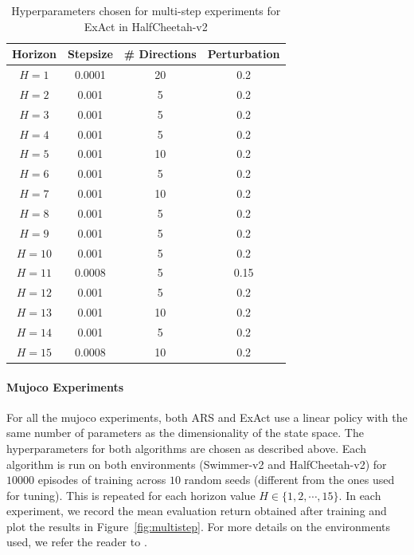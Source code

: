 \begin{table}[ht]
    \centering
    \begin{tabular}{|c|c|c|c|}
    \hline
      \textbf{Horizon} & \textbf{Stepsize} &
                                             \textbf{\#
                                             Directions} &
                                                           \textbf{Perturbation}\\

      \hline
      $H = 1$ &0.0001   &20  &  0.2\\
      \hline
      $H = 2$ &  0.001 & 5 &  0.2\\
      \hline
      $H = 3$ &  0.001  & 5 & 0.2\\
      \hline
      $H = 4$ &  0.001  & 5 & 0.2 \\
      \hline
      $H = 5$ &  0.001  &10  & 0.2 \\
      \hline
      $H = 6$ &  0.001  & 5 & 0.2 \\
      \hline
      $H = 7$ &  0.001  &10  & 0.2 \\
      \hline
      $H = 8$ &  0.001  & 5 & 0.2 \\
      \hline
      $H = 9$ &  0.001  & 5 & 0.2 \\
      \hline
      $H = 10$ &  0.001  & 5 & 0.2 \\
      \hline
      $H = 11$ & 0.0008   & 5 & 0.15 \\
      \hline
      $H = 12$ &  0.001  & 5 & 0.2\\
      \hline
      $H = 13$ &  0.001  & 10 & 0.2 \\
      \hline
      $H = 14$ &  0.001  & 5 & 0.2\\
      \hline
      $H = 15$ &  0.0008  & 10 & 0.2 \\
      \hline
    \end{tabular}
    \caption{Hyperparameters chosen for multi-step experiments for ExAct
    in HalfCheetah-v2}
    \label{tab:chosen-hyperparam-multi-exact-halfcheetah}
\end{table}


\paragraph{Mujoco Experiments}
\label{sec:mujoco-experiments}

For all the mujoco experiments, both ARS and ExAct use a linear
policy with the same number of parameters as the dimensionality of the
state space. The hyperparameters for both algorithms are chosen as
described above. Each algorithm is run on both
environments (Swimmer-v2
and HalfCheetah-v2) for $10000$ episodes of training across $10$
random seeds (different from the ones used for tuning). This is
repeated for each horizon value $H \in \{1, 2, \cdots, 15\}$. In each
experiment, we record the mean evaluation return obtained after
training and plot the results in Figure~\ref{fig:multistep}. For more details on the environments used, we
refer the reader to \citep{brockman2016openai}.

